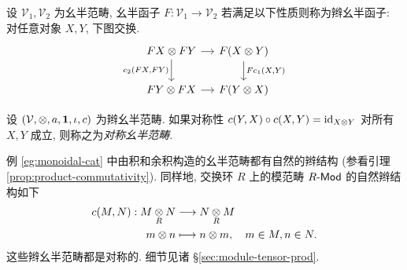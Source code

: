 \begin{definition}
	设 $\mathcal{V}_1, \mathcal{V}_2$ 为幺半范畴, 幺半函子 $F: \mathcal{V}_1 \to \mathcal{V}_2$ 若满足以下性质则称为辫幺半函子: 对任意对象 $X, Y$, 下图交换.
	\[ \begin{tikzcd}[column sep=small]
		FX \otimes FY \arrow[r] \arrow[d, "{c_2(FX, FY)}"'] & F(X \otimes Y) \arrow[d, "{Fc_1(X, Y)}"] \\
		FY \otimes FX \arrow[r] & F(Y \otimes X)
	\end{tikzcd} \]
\end{definition}

\begin{definition}\label{def:symm-monoidal-cat}
	设 $(\mathcal{V}, \otimes, a, \mathbf{1}, \iota, c)$ 为辫幺半范畴. 如果对称性 $c(Y,X) \circ c(X, Y) = \mathrm{id}_{X \otimes Y}$ 对所有 $X, Y$ 成立, 则称之为\emph{对称幺半范畴}.
\end{definition}

\begin{example}
	例 \ref{eg:monoidal-cat} 中由积和余积构造的幺半范畴都有自然的辫结构 (参看引理 \ref{prop:product-commutativity}). 同样地, 交换环 $R$ 上的模范畴 $R\text{-}\mathsf{Mod}$ 的自然辫结构如下
	\begin{align*}
		c(M, N): M \underset{R}{\otimes} N & \longrightarrow N \underset{R}{\otimes} M \\
		m \otimes n & \longmapsto n \otimes m, \quad m \in M, n \in N.
	\end{align*}
	这些辫幺半范畴都是对称的. 细节见诸 \S\ref{sec:module-tensor-prod}.
\end{example}

